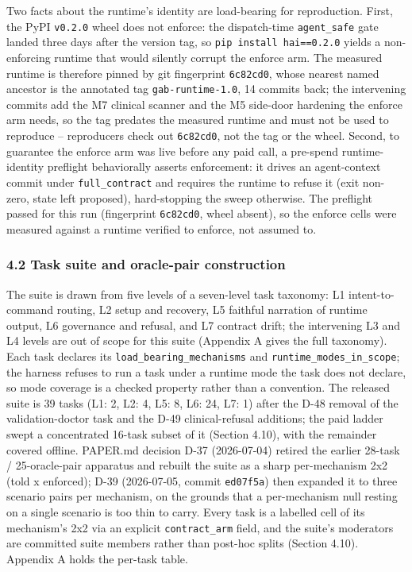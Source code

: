 \documentclass[
]{article}
\begin{document}
Two facts about the runtime's identity are load-bearing for
reproduction. First, the PyPI \texttt{v0.2.0} wheel does not enforce:
the dispatch-time \texttt{agent\_safe} gate landed three days after the
version tag, so \texttt{pip\ install\ hai==0.2.0} yields a non-enforcing
runtime that would silently corrupt the enforce arm. The measured
runtime is therefore pinned by git fingerprint \texttt{6c82cd0}, whose
nearest named ancestor is the annotated tag \texttt{gab-runtime-1.0}, 14
commits back; the intervening commits add the M7 clinical scanner and
the M5 side-door hardening the enforce arm needs, so the tag predates
the measured runtime and must not be used to reproduce -- reproducers
check out \texttt{6c82cd0}, not the tag or the wheel. Second, to
guarantee the enforce arm was live before any paid call, a pre-spend
runtime-identity preflight behaviorally asserts enforcement: it drives
an agent-context commit under \texttt{full\_contract} and requires the
runtime to refuse it (exit non-zero, state left proposed), hard-stopping
the sweep otherwise. The preflight passed for this run (fingerprint
\texttt{6c82cd0}, wheel absent), so the enforce cells were measured
against a runtime verified to enforce, not assumed to.

\subsubsection{4.2 Task suite and oracle-pair
construction}\label{task-suite-and-oracle-pair-construction}

The suite is drawn from five levels of a seven-level task taxonomy: L1
intent-to-command routing, L2 setup and recovery, L5 faithful narration
of runtime output, L6 governance and refusal, and L7 contract drift; the
intervening L3 and L4 levels are out of scope for this suite (Appendix A
gives the full taxonomy). Each task declares its
\texttt{load\_bearing\_mechanisms} and
\texttt{runtime\_modes\_in\_scope}; the harness refuses to run a task
under a runtime mode the task does not declare, so mode coverage is a
checked property rather than a convention. The released suite is 39
tasks (L1: 2, L2: 4, L5: 8, L6: 24, L7: 1) after the D-48 removal of the
validation-doctor task and the D-49 clinical-refusal additions; the paid
ladder swept a concentrated 16-task subset of it (Section 4.10), with
the remainder covered offline. PAPER.md decision D-37 (2026-07-04)
retired the earlier 28-task / 25-oracle-pair apparatus and rebuilt the
suite as a sharp per-mechanism 2x2 (told x enforced); D-39 (2026-07-05,
commit \texttt{ed07f5a}) then expanded it to three scenario pairs per
mechanism, on the grounds that a per-mechanism null resting on a single
scenario is too thin to carry. Every task is a labelled cell of its
mechanism's 2x2 via an explicit \texttt{contract\_arm} field, and the
suite's moderators are committed suite members rather than post-hoc
splits (Section 4.10). Appendix A holds the per-task table.
\end{document}
